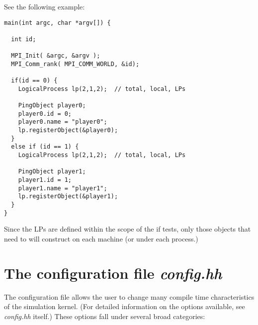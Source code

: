 \documentclass[11pt]{report}
\begin{document}
See the following example:

\begin{verbatim}
main(int argc, char *argv[]) {
  
  int id;

  MPI_Init( &argc, &argv );
  MPI_Comm_rank( MPI_COMM_WORLD, &id);

  if(id == 0) {
    LogicalProcess lp(2,1,2);  // total, local, LPs

    PingObject player0;
    player0.id = 0;
    player0.name = "player0";
    lp.registerObject(&player0);
  }
  else if (id == 1) {
    LogicalProcess lp(2,1,2);  // total, local, LPs

    PingObject player1;
    player1.id = 1;
    player1.name = "player1";
    lp.registerObject(&player1);
  }
}
\end{verbatim}

Since the LPs are defined within the scope of the if tests, only those
objects that need to will construct on each machine (or under each
process.)

\section{The configuration file {\it config.hh}}

The configuration file allows the user to change many compile time
characteristics of the simulation kernel. (For detailed information on
the options available, see {\it config.hh} itself.) These options fall under
several broad categories:
\end{document}
